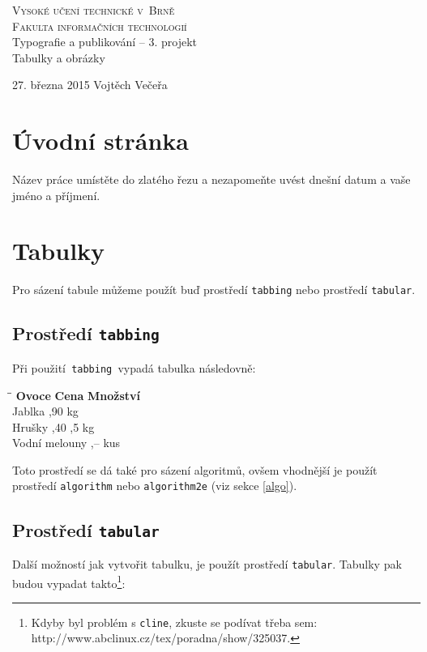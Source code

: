 \documentclass[11pt,a4paper,onecolumn]{article}
\begin{document}
\begin{titlepage}
  \begin{center}

    \textsc{\Huge Vysoké učení technické v~Brně\\\huge Fakulta informačních technologií}\\
    \LARGE Typografie a publikování -- 3. projekt\\\Huge
    Tabulky a obrázky\\
  \end{center}
  {\Large 27. března 2015 \hfill Vojtěch Večeřa}
\end{titlepage}

\section{Úvodní stránka}
\label{uvod}
\noindent Název práce umístěte do zlatého řezu a nezapomeňte uvést dnešní datum a vaše jméno a příjmení.
\section{Tabulky}
\label{tabulky}
\noindent Pro sázení tabule můžeme použít buď prostředí \texttt{tabbing} nebo prostředí \texttt{tabular}.
\subsection{Prostředí \texttt{tabbing}}
\noindent Při použití\texttt{ tabbing }vypadá tabulka následovně:
\begin{tabbing}
\pushtabs \qquad\qquad\qquad\qquad \= \qquad\qquad \= \qquad\qquad \kill
\textbf{Ovoce} \> \textbf{Cena} \> \textbf{Množství} \\
Jablka ,90  kg \\
Hrušky ,40 ,5 kg \\
Vodní melouny ,--  kus \\
\poptabs
\end{tabbing}
\noindent Toto prostředí se dá také pro sázení algoritmů, ovšem vhodnější je použít prostředí \texttt{algorithm} nebo \texttt{algorithm2e} (viz sekce \ref{algo}).
\subsection{Prostředí \texttt{tabular}}
\noindent Další možností jak vytvořit tabulku, je použít prostředí \texttt{tabular}. Tabulky pak budou vypadat takto\footnote{Kdyby byl problém s \texttt{cline}, zkuste se podívat třeba sem: http://www.abclinux.cz/tex/poradna/show/325037.}:
\end{document}
